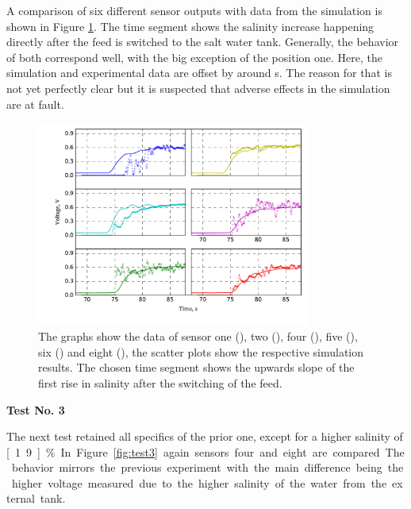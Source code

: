 A comparison of six different sensor outputs with data from the simulation is shown in Figure \ref{fig:test2_sim}. The time segment shows the salinity increase happening directly after the feed is switched to the salt water tank. Generally, the behavior of both correspond well, with the big exception of the position one. Here, the simulation and experimental data are offset by around \unit[2]{s}. The reason for that is not yet perfectly clear but it is suspected that adverse effects in the simulation are at fault.

\begin{figure}[H]
	\begin{center}
		\includegraphics[width=0.8\textwidth]{images/log080716_2_sim.pdf} 
		\caption{The graphs show the data of sensor one (\drawline[blue]), two (), four (\drawline[cyan]), five (), six () and eight (\drawline[red]), the scatter plots show the respective simulation results. The chosen time segment shows the upwards slope of the first rise in salinity after the switching of the feed.}
		\label{fig:test2_sim}
	\end{center}
\end{figure}

\textbf{Test No. 3}

The next test retained all specifics of the prior one, except for a higher salinity of \unit[1.9]{\%}. In Figure \ref{fig:test3} again sensors four and eight are compared. The behavior mirrors the previous experiment with the main difference being the higher voltage measured due to the higher salinity of the water from the external tank.

